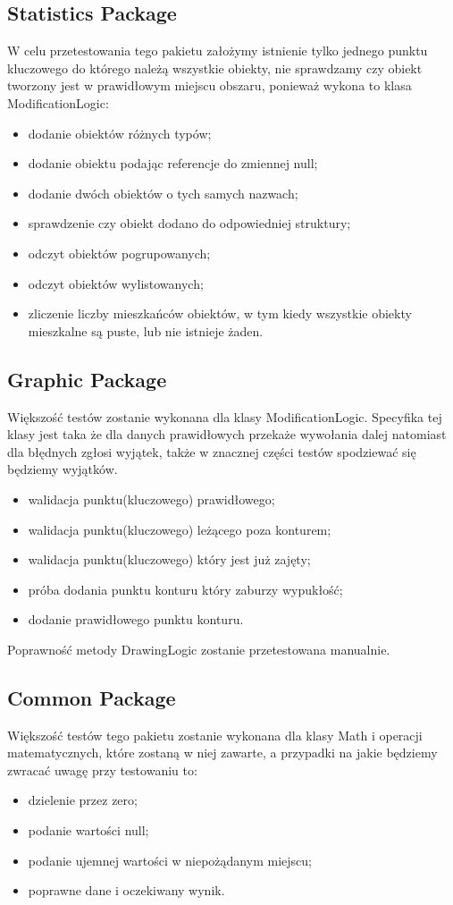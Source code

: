 \documentclass[a4paper,11pt]{article}
\begin{document}
\subsection{Statistics Package}
W celu przetestowania tego pakietu założymy istnienie tylko jednego punktu kluczowego do którego należą wszystkie obiekty, nie sprawdzamy czy obiekt tworzony jest w prawidłowym miejscu obszaru, ponieważ wykona to klasa ModificationLogic:
\begin{itemize}
\item dodanie obiektów różnych typów;
\item dodanie obiektu podając referencje do zmiennej null;
\item dodanie dwóch obiektów o tych samych nazwach;
\item sprawdzenie czy obiekt dodano do odpowiedniej struktury; 
\item odczyt obiektów pogrupowanych;
\item odczyt obiektów wylistowanych;
\item zliczenie liczby mieszkańców obiektów, w tym kiedy wszystkie obiekty mieszkalne są puste, lub nie istnieje żaden.
\end{itemize}
\subsection{Graphic Package}
Większość testów zostanie wykonana dla klasy ModificationLogic. Specyfika tej klasy jest taka że dla danych prawidłowych przekaże wywołania dalej natomiast dla błędnych zgłosi wyjątek, także w znacznej części testów spodziewać się będziemy wyjątków.
\begin{itemize}
\item walidacja punktu(kluczowego) prawidłowego;
\item walidacja punktu(kluczowego) leżącego poza konturem;
\item walidacja punktu(kluczowego) który jest już zajęty;
\item próba dodania punktu konturu który zaburzy wypukłość;
\item dodanie prawidłowego punktu konturu.
\end{itemize}
Poprawność metody DrawingLogic zostanie przetestowana manualnie.

\subsection{Common Package}
Większość testów tego pakietu zostanie wykonana dla klasy Math i operacji matematycznych, które zostaną w niej zawarte, a przypadki na jakie będziemy zwracać uwagę przy testowaniu to:
\begin{itemize}
\item dzielenie przez zero;
\item podanie wartości null;
\item podanie ujemnej wartości w niepożądanym miejscu;
\item poprawne dane i oczekiwany wynik.
\end{itemize}
\end{document}
